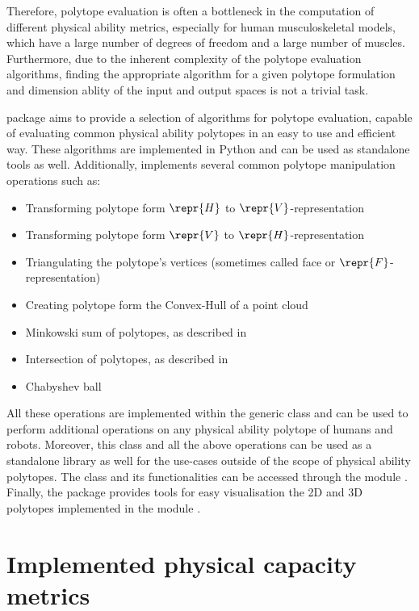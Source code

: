Therefore, polytope evaluation is often a bottleneck in the computation of different physical ability metrics, especially for human musculoskeletal models, which have a large number of degrees of freedom and a large number of muscles. Furthermore, due to the inherent complexity of the polytope evaluation algorithms, finding the appropriate algorithm for a given polytope formulation and dimension ablity of the input and output spaces is not a trivial task.


 package aims to provide a selection of algorithms for polytope evaluation, capable of evaluating common physical ability polytopes in an easy to use and efficient way.  These algorithms are implemented in Python and can be used as standalone tools as well. 
Additionally,  implements several common polytope manipulation operations such as: 
\begin{itemize}
    \item Transforming polytope form $\repr{H}$ to  $\repr{V}$-representation
    \item Transforming polytope form $\repr{V}$ to  $\repr{H}$-representation
    \item Triangulating the polytope's vertices (sometimes called face or $\repr{F}$-representation) 
    \item Creating polytope form the Convex-Hull of a point cloud
    \item Minkowski sum of polytopes, as described in 
    \item Intersection of polytopes, as described in 
    \item Chabyshev ball
\end{itemize}
All these operations are implemented within the generic class  and can be used to perform additional operations on any physical ability polytope of humans and robots. Moreover, this class and all the above operations can be used as a standalone library as well for the use-cases outside of the scope of physical ability polytopes. The  class and its functionalities can be accessed through the module . Finally, the package provides tools for easy visualisation the 2D and 3D polytopes implemented in the module .

\section{Implemented physical capacity metrics}

